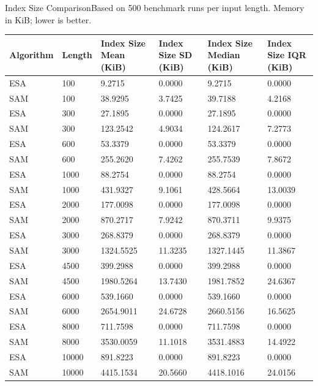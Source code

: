 \begin{benchmarktable}{Index Size Comparison}{Based on 500 benchmark runs per input length. Memory in KiB; lower is better.}
\begin{tabularx}{\textwidth}{|X|X|X|X|X|X|}
\toprule
Algorithm & Length & Index Size Mean (KiB) & Index Size SD (KiB) & Index Size Median (KiB) & Index Size IQR (KiB) \\
\midrule
ESA & 100 & 9.2715 & 0.0000 & 9.2715 & 0.0000 \\
SAM & 100 & 38.9295 & 3.7425 & 39.7188 & 4.2168 \\
\hline
ESA & 300 & 27.1895 & 0.0000 & 27.1895 & 0.0000 \\
SAM & 300 & 123.2542 & 4.9034 & 124.2617 & 7.2773 \\
\hline
ESA & 600 & 53.3379 & 0.0000 & 53.3379 & 0.0000 \\
SAM & 600 & 255.2620 & 7.4262 & 255.7539 & 7.8672 \\
\hline
ESA & 1000 & 88.2754 & 0.0000 & 88.2754 & 0.0000 \\
SAM & 1000 & 431.9327 & 9.1061 & 428.5664 & 13.0039 \\
\hline
ESA & 2000 & 177.0098 & 0.0000 & 177.0098 & 0.0000 \\
SAM & 2000 & 870.2717 & 7.9242 & 870.3711 & 9.9375 \\
\hline
ESA & 3000 & 268.8379 & 0.0000 & 268.8379 & 0.0000 \\
SAM & 3000 & 1324.5525 & 11.3235 & 1327.1445 & 11.3867 \\
\hline
ESA & 4500 & 399.2988 & 0.0000 & 399.2988 & 0.0000 \\
SAM & 4500 & 1980.5264 & 13.7430 & 1981.7852 & 24.6367 \\
\hline
ESA & 6000 & 539.1660 & 0.0000 & 539.1660 & 0.0000 \\
SAM & 6000 & 2654.9011 & 24.6728 & 2660.5156 & 16.5625 \\
\hline
ESA & 8000 & 711.7598 & 0.0000 & 711.7598 & 0.0000 \\
SAM & 8000 & 3530.0059 & 11.1018 & 3531.4883 & 14.4922 \\
\hline
ESA & 10000 & 891.8223 & 0.0000 & 891.8223 & 0.0000 \\
SAM & 10000 & 4415.1534 & 20.5660 & 4418.1016 & 24.0156 \\
\bottomrule
\end{tabularx}
\end{benchmarktable}